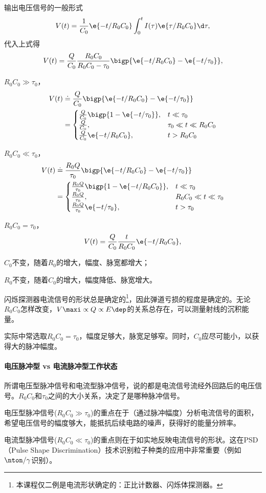 输出电压信号的一般形式
\[
	V(t)=\frac1{C_0}\e{-t/R_0C_0}\int_0^tI(\tau)\e{\tau/R_0C_0}\d\tau,
\]
代入上式得
\[
	V(t)=\frac Q{C_0}\frac{R_0C_0}{R_0C_0-\tau_0}\bigp{\e{-t/R_0C_0}-\e{-t/\tau_0}},
\]
\begin{compactitem}
	\item $R_0C_0\gg\tau_0$，
	\begin{align*}
		V(t)&\doteq\frac Q{C_0}\bigp{\e{-t/R_0C_0}-\e{-t/\tau_0}}\\
		&=\begin{cases}
			\frac Q{C_0}\bigp{1-\e{-t/\tau_0}},&t\ll\tau_0\\
			\frac Q{C_0},&\tau_0\ll t\ll R_0C_0\\
			\frac Q{C_0}\e{-t/R_0C_0},&t>R_0C_0
		\end{cases}
	\end{align*}
	\item $R_0C_0\ll\tau_0$，
	\begin{align*}
		V(t)&\doteq\frac{R_0Q}{\tau_0}\bigp{\e{-t/R_0C_0}-\e{-t/\tau_0}}\\
		&=\begin{cases}
			\frac{R_0Q}{\tau_0}\bigp{1-\e{-t/R_0C_0}},&t\ll\tau_0\\
			\frac {R_0Q}{\tau_0},&R_0C_0\ll t\ll \tau_0\\
			\frac {R_0Q}{\tau_0}\e{-t/\tau_0},&t>\tau_0
		\end{cases}
	\end{align*}
	\item $R_0C_0=\tau_0$，
	\[
		V(t)=\frac{Q}{C_0}\frac{t}{R_0C_0}\e{-t/R_0C_0},
	\]
	
	\item $C_0$不变，随着$R_0$的增大，幅度、脉宽都增大；
	\item $R_0$不变，随着$C_0$的增大，幅度降低、脉宽增大。
\end{compactitem}

闪烁探测器电流信号的形状总是确定的\footnote{本课程仅二例是电流形状确定的：正比计数器、闪烁体探测器。}，因此弹道亏损的程度是确定的。无论$R_0C_0$怎样改变，$V\maxi\propto Q\propto E\dep$的关系总存在，可以测量射线的沉积能量。

实际中常选取$R_0C_0=\tau_0$，幅度足够大，脉宽足够窄。同时，$C_0$应尽可能小，以获得大的脉冲幅度。
\paragraph{电压脉冲型 vs 电流脉冲型工作状态}
所谓电压型脉冲信号和电流型脉冲信号，说的都是电流信号流经外回路后的电压信号。$R_0C_0$和$\tau_0$之间的大小关系，决定了是哪种脉冲信号。
\begin{compactitem}
	\item 电压型脉冲信号($R_0C_0\gg\tau_0$)的重点在于（通过脉冲幅度）分析电流信号的面积，希望电压信号的幅度够大，能抵抗后续电路的噪声，获得好的能量分辨率。
	\item 电流型脉冲信号($R_0C_0\ll\tau_0$)的重点则在于如实地反映电流信号的形状。这在PSD （Pulse Shape Discrimination）技术识别粒子种类的应用中非常重要（例如$\nton/\gamma$识别）。
\end{compactitem}

